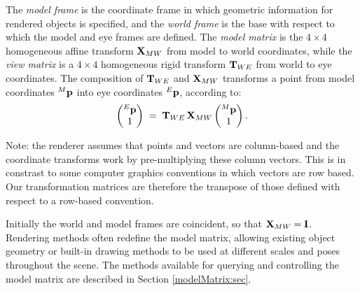 The {\it model frame} is the coordinate frame in which geometric
information for rendered objects is specified, and the {\it world frame} is the
base with respect to which the model and eye frames are defined. The
{\it model matrix} is the $4 \times 4$ homogeneous affine transform
${\bf X}_{MW}$ from model to world coordinates, while the {\it view matrix}
is a $4 \times 4$ homogeneous rigid transform ${\bf T}_{WE}$ from world to eye
coordinates. The composition of ${\bf T}_{WE}$ and ${\bf X}_{MW}$ transforms a
point from model coordinates ${}^M{\bf p}$ into eye coordinates ${}^E{\bf p}$,
according to:
%
\begin{equation*}
\left(\begin{matrix} {}^E{\bf p} \\ 1 \end{matrix}\right) \;=\;
{\bf T}_{WE} \, {\bf X}_{MW} \left(\begin{matrix} {}^M{\bf p} \\ 1 \end{matrix}\right).
\end{equation*}
%

\begin{sideblock}
Note: the renderer assumes that points and vectors are column-based
and the coordinate transforms work by pre-multiplying these column
vectors. This is in constrast to some computer graphics conventions in
which vectors are row based. Our transformation matrices are therefore
the transpose of those defined with respect to a row-based convention.
\end{sideblock}

Initially the world and model frames are coincident, so that ${\bf X}_{MW}
= {\bf I}$. Rendering methods often redefine the model matrix, allowing
existing object geometry or built-in drawing methods to be used at
different scales and poses throughout the scene.  The methods
available for querying and controlling the model matrix are described
in Section \ref{modelMatrix:sec}.

